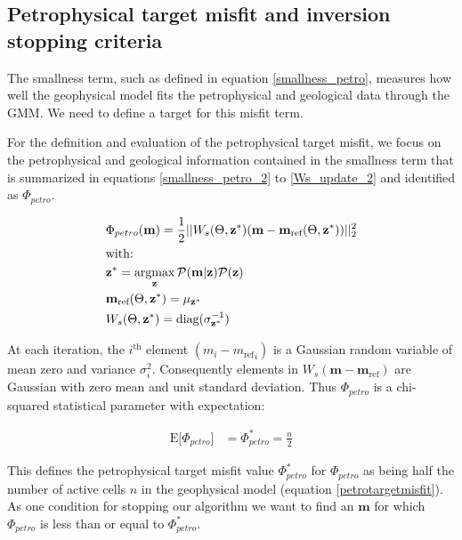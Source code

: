 \documentclass[extra]{gji} %
\begin{document}
\subsection{Petrophysical target misfit and inversion stopping criteria} \label{section:stopping}

The smallness term, such as defined in equation \ref{smallness_petro}, measures how well the geophysical model fits the petrophysical and geological data through the GMM. We need to define a target for this misfit term.

For the definition and evaluation of the petrophysical target misfit, we  focus on the petrophysical and geological information contained in the smallness term that is summarized in equations \ref{smallness_petro_2} to \ref{Ws_update_2} and identified as $\Phi_{petro}$.

\begin{align}
&\Phi_{petro}(\mathbf{m}) = \frac{1}{2}||W_{s}(\Theta, \mathbf{z}^*)(\mathbf{m}-\mathbf{m}_{\text{ref}}(\Theta, \mathbf{z}^*))||_2^2 \label{smallness_petro_2}\\
&\text{with:}\nonumber\\
&\mathbf{z^*} = \mathop{\hbox{argmax}}\limits_{\mathbf{z}}\mathcal{P}(\mathbf{m}|\mathbf{z})\mathcal{P}(\mathbf{z}) \label{membership_2} \\
&\mathbf{m}_{\text{ref}}(\Theta, \mathbf{z}^*) = {\mu}_{\mathbf{z}^*} \label{mref_update_2}\\
&W_{s}(\Theta, \mathbf{z}^*) = \text{diag}({\sigma_{\mathbf{z}^*}^{-1}}) \label{Ws_update_2}
\end{align}

At each iteration, the $i^{\text{th}}$ element $(m_i-{m_{\text{ref}}}_i)$ is a Gaussian random variable of mean zero and variance $\sigma_i^2$. Consequently elements in $W_s(\mathbf{m}-\mathbf{m}_{\text{ref}})$ are Gaussian with zero mean and unit standard deviation. Thus $\Phi_{petro}$ is a chi-squared statistical parameter with expectation:

\begin{align}
\text{E}\lbrack\Phi_{petro}\rbrack &= \Phi_{petro}^* = \frac{n}{2} \label{petrotargetmisfit}
\end{align}

This defines the petrophysical target misfit value $\Phi_{petro}^*$ for $\Phi_{petro}$ as being half the number of active cells $n$ in the geophysical model (equation \ref{petrotargetmisfit}). As one condition for stopping our algorithm we want to find an $\mathbf{m}$ for which $\Phi_{petro}$ is less than or equal to $\Phi_{petro}^*$.
\end{document}
